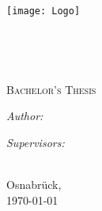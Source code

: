 \documentclass[11pt, english, singlespacing, 
headsepline, %
chapterinoneline, %
]{MastersDoctoralThesis}
\author{Christoph Stenkamp} %
\begin{document}
	
	\frontmatter %
	
	\pagestyle{plain} %
	


	\begin{titlepage}
		\begin{center}
			
			\texttt{[image: Logo]} %
			
			\vspace*{.06\textheight}
			\HRule \\[0.4cm] %
			{\huge \bfseries \ttitle\par}\vspace{0.4cm} %
			\HRule \\[1.5cm] %
			
			{\scshape\LARGE \univname\par}\vspace{.5cm} %
			
			{\scshape\Large \deptname \par}\vspace{1.5cm}
			
			\textsc{\Large Bachelor's Thesis}\\[0.5cm] %
			
			\vspace*{.1\textheight} 
			\begin{minipage}[t]{0.4\textwidth}
				\begin{flushleft} \large
					\emph{Author:}\\
					\authorname %
				\end{flushleft}
			\end{minipage}
			\begin{minipage}[t]{0.4\textwidth}
				\begin{flushright} \large
					\emph{Supervisors:} \\
					\supname %
				\end{flushright}
			\end{minipage}\\[3cm]

			\vfill
			Osnabrück,\\
			\today
			
		\end{center}
	\end{titlepage}	
\end{document}
